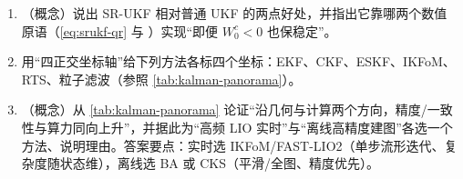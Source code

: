 \begin{practice}
\begin{enumerate}
  \item （概念）说出 SR-UKF 相对普通 UKF 的两点好处，并指出它靠哪两个数值原语（\cref{eq:srukf-qr} 与 \verb@cholupdate@）实现“即便 $W_0^c<0$ 也保稳定”。
  \item 用“四正交坐标轴”给下列方法各标四个坐标：EKF、CKF、ESKF、IKFoM、RTS、粒子滤波（参照 \cref{tab:kalman-panorama}）。
  \item （概念）从 \cref{tab:kalman-panorama} 论证“沿几何与计算两个方向，精度/一致性与算力同向上升”，并据此为“高频 LIO 实时”与“离线高精度建图”各选一个方法、说明理由。答案要点：实时选 IKFoM/FAST-LIO2（单步流形迭代、复杂度随状态维），离线选 BA 或 CKS（平滑/全图、精度优先）。
\end{enumerate}
\end{practice}


